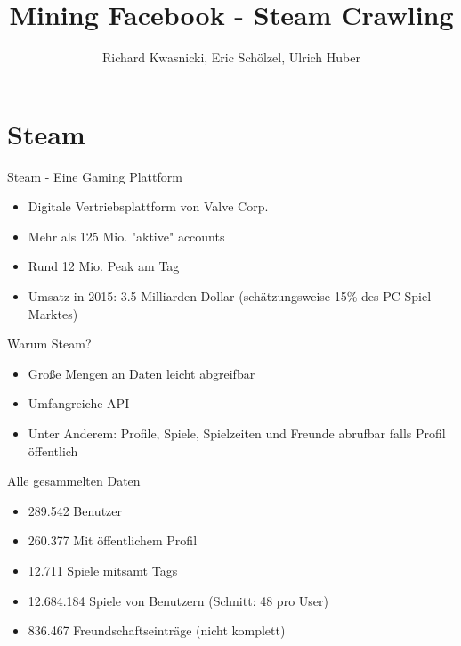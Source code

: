 \documentclass[12pt]{beamer}
\author{Richard Kwasnicki, Eric Schölzel, Ulrich Huber}
\title{Mining Facebook - Steam Crawling}
\begin{document}
\begin{frame}
\titlepage
\end{frame}


\section{Steam}
\begin{frame}{Steam - Eine Gaming Plattform}
	\begin{itemize}
		\item Digitale Vertriebsplattform von Valve Corp.
		\item Mehr als 125 Mio. "aktive" accounts
		\item Rund 12 Mio. Peak am Tag
		\item Umsatz in 2015:  3.5 Milliarden Dollar (schätzungsweise 15\% des PC-Spiel Marktes)
	\end{itemize}
\end{frame}

\begin{frame}{Warum Steam?}
	\begin{itemize}
		\item Große Mengen an Daten leicht abgreifbar
		\item Umfangreiche API
		\item Unter Anderem: Profile, Spiele, Spielzeiten und Freunde abrufbar falls Profil öffentlich 
	\end{itemize}
\end{frame}

\begin{frame}{Alle gesammelten Daten}
	\begin{itemize}
		\item 289.542 Benutzer
		\item 260.377 Mit öffentlichem Profil
		\item 12.711 Spiele mitsamt Tags
		\item 12.684.184 Spiele von Benutzern (Schnitt: 48 pro User)
		\item 836.467 Freundschaftseinträge (nicht komplett)
	\end{itemize}
\end{frame}
\end{document}
